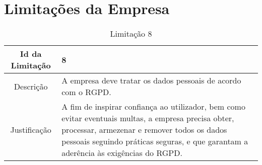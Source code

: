 \section{Limitações da Empresa}\label{0:0.3.8}

\begin{table}[!h]
\begin{center}
    \begin{tabularx}{\textwidth}{ | c | X | }
    \hline
    Id da Limitação & 8 \\
    \hline
    Descrição & A empresa deve tratar os dados pessoais de acordo com o RGPD. \\
    \hline
    Justificação & A fim de inspirar confiança ao utilizador, bem como evitar eventuais multas, a empresa precisa obter, processar, armezenar e remover todos os dados pessoais seguindo práticas seguras, e que garantam a aderência às exigências do RGPD. \\
    \hline
    \end{tabularx}
    \caption{Limitação 8} \label{tab:r8}
\end{center}
\end{table}